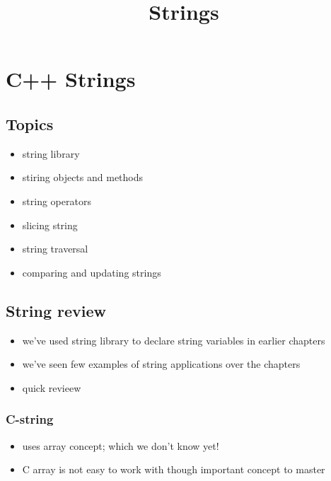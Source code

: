 \documentclass[11pt]{article}
\title{Strings}
\providecommand{\tightlist}{%
      \setlength{\itemsep}{0pt}\setlength{\parskip}{0pt}}
\begin{document}
    
    \maketitle
    
    

    
    \hypertarget{c-strings}{%
\section{C++ Strings}\label{c-strings}}

\hypertarget{topics}{%
\subsection{Topics}\label{topics}}

\begin{itemize}
\tightlist
\item
  string library
\item
  stiring objects and methods
\item
  string operators
\item
  slicing string
\item
  string traversal
\item
  comparing and updating strings
\end{itemize}

\hypertarget{string-review}{%
\subsection{String review}\label{string-review}}

\begin{itemize}
\tightlist
\item
  we've used string library to declare string variables in earlier
  chapters
\item
  we've seen few examples of string applications over the chapters
\item
  quick revieew
\end{itemize}

\hypertarget{c-string}{%
\subsubsection{C-string}\label{c-string}}

\begin{itemize}
\tightlist
\item
  uses array concept; which we don't know yet!
\item
  C array is not easy to work with though important concept to master
\end{itemize}
\end{document}
